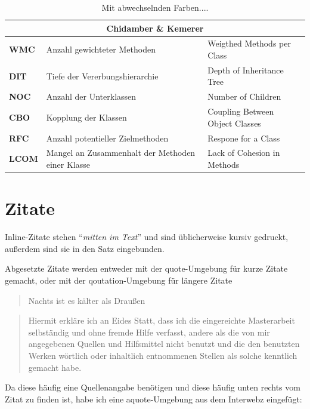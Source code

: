 \begin{table}[h]
	\centering
	
	\begin{tabular}{lp{6cm}p{6cm}}
		\toprule
		\multicolumn{3}{c}{Chidamber \& Kemerer}\\ 
		\midrule
		\textbf{WMC}  &Anzahl gewichteter Methoden 				&  Weigthed Methods per Class 		\\ 
		\textbf{DIT}  &Tiefe der Vererbungshierarchie  			&  Depth of Inheritance Tree 		\\ 
		\textbf{NOC}  &Anzahl der Unterklassen 					&  Number of Children 				\\ 
		\textbf{CBO}  &Kopplung der Klassen 					&  Coupling Between Object Classes 	\\  
		\textbf{RFC}  &Anzahl potentieller Zielmethoden 		&  Respone for a Class  			\\  
		\textbf{LCOM} &Mangel an Zusammenhalt der Methoden
		 				einer Klasse 							&  Lack of Cohesion in Methods  		\\ 
		\bottomrule
	\end{tabular} 
	\caption{Mit abwechselnden Farben....}
	\label{tab:ck}
\end{table}



\section{Zitate}

Inline-Zitate stehen \enquote{\emph{mitten im Text}} und sind üblicherweise kursiv gedruckt, außerdem sind sie in den Satz eingebunden.

Abgesetzte Zitate werden entweder mit der quote-Umgebung für kurze Zitate gemacht, oder mit der qoutation-Umgebung für längere Zitate

\begin{quote}
Nachts ist es kälter als Draußen
\end{quote}


\begin{quotation}
Hiermit erkläre ich an Eides Statt, dass ich die eingereichte Masterarbeit
				selbständig und ohne fremde Hilfe verfasst, andere als die von mir angegebenen Quellen
				und Hilfsmittel nicht benutzt und die den benutzten Werken wörtlich oder
				inhaltlich entnommenen Stellen als solche kenntlich gemacht habe. 
\end{quotation}

Da diese häufig eine Quellenangabe benötigen und diese häufig unten rechts vom Zitat zu finden ist, habe ich eine aquote-Umgebung aus dem Interwebz eingefügt:

